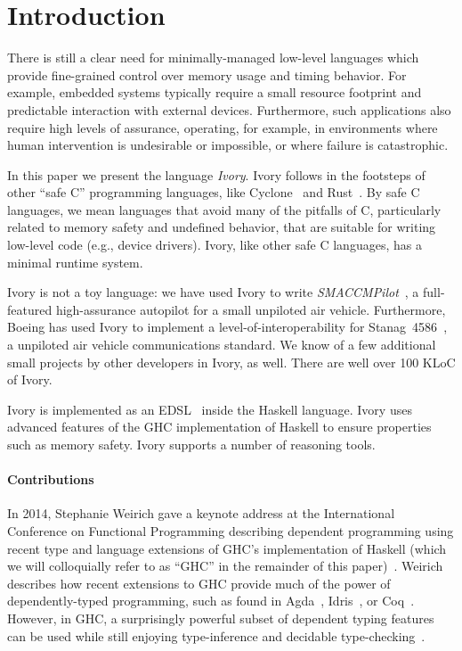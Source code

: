\section{Introduction}
\label{sec:introduction}


There is still a clear need for minimally-managed low-level languages
which provide fine-grained control over memory usage and timing
behavior.  For example, embedded systems typically require a small
resource footprint and predictable interaction with external devices.
Furthermore, such applications also require high levels of assurance,
operating, for example, in environments where human intervention is
undesirable or impossible, or where failure is catastrophic.

In this paper we present the language \emph{Ivory}.  Ivory follows in
the footsteps of other ``safe C'' programming languages, like
Cyclone~\cite{cyclone} and Rust~\cite{rust}. By safe C languages, we
mean languages that avoid many of the pitfalls of C, particularly
related to memory safety and undefined behavior, that are suitable for
writing low-level code (e.g., device drivers). Ivory, like other safe
C languages, has a minimal runtime system.

Ivory is not a toy language: we have used Ivory to write
\emph{SMACCMPilot}~\cite{smaccm}, a full-featured high-assurance
autopilot for a small unpiloted air vehicle.  Furthermore, Boeing has
used Ivory to implement a level-of-interoperability for
Stanag~4586~\cite{stanag}, a unpiloted air vehicle communications
standard. We know of a few additional small projects by other
developers in Ivory, as well.  There are well over 100 KLoC of Ivory.

Ivory is implemented as an EDSL~\cite{edsl} inside the Haskell
language.  Ivory uses advanced features of the GHC implementation of
Haskell to ensure properties such as memory safety.  Ivory supports a
number of reasoning tools.

\paragraph{Contributions}
In 2014, Stephanie Weirich gave a keynote address at the International
Conference on Functional Programming describing dependent programming using
recent type and language extensions of GHC's implementation of Haskell (which we
will colloquially refer to as ``GHC'' in the remainder of this
paper)~\cite{weirich-keynote}. Weirich describes how recent extensions to GHC
provide much of the power of dependently-typed programming, such as found in
Agda~\cite{agda}, Idris~\cite{idris}, or Coq~\cite{coq}. However, in GHC, a surprisingly
powerful subset of dependent typing features can be used while still enjoying
type-inference and decidable type-checking~\cite{dephaskell}.


